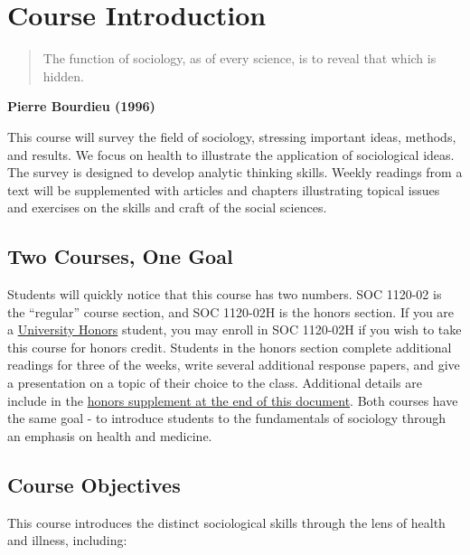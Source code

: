 \documentclass[]{book}
\begin{document}
\hypertarget{course-introduction}{%
\chapter{Course Introduction}\label{course-introduction}}

\begin{quote}
The function of sociology, as of every science, is to reveal that which is hidden.
\end{quote}

\textbf{Pierre Bourdieu (1996)}

This course will survey the field of sociology, stressing important ideas, methods, and results. We focus on health to illustrate the application of sociological ideas. The survey is designed to develop analytic thinking skills. Weekly readings from a text will be supplemented with articles and chapters illustrating topical issues and exercises on the skills and craft of the social sciences.

\hypertarget{two-courses-one-goal}{%
\section{Two Courses, One Goal}\label{two-courses-one-goal}}

Students will quickly notice that this course has two numbers. SOC 1120-02 is the ``regular'' course section, and SOC 1120-02H is the honors section. If you are a \href{https://www.slu.edu/honors/index.php}{University Honors} student, you may enroll in SOC 1120-02H if you wish to take this course for honors credit. Students in the honors section complete additional readings for three of the weeks, write several additional response papers, and give a presentation on a topic of their choice to the class. Additional details are include in the \href{/honors-overview.html}{honors supplement at the end of this document}. Both courses have the same goal - to introduce students to the fundamentals of sociology through an emphasis on health and medicine.

\hypertarget{course-objectives}{%
\section{Course Objectives}\label{course-objectives}}

This course introduces the distinct sociological skills through the lens of health and illness, including:
\end{document}
